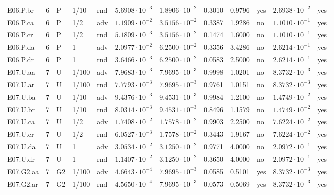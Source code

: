 {\begin{longtable}{@{}lllllllllll l@{}}
E06.P.br & 6 & P & 1/10 & rnd & $5.6908\cdot 10^{-3}$ & $1.8906\cdot 10^{-2}$ & 0.3010 & 0.9796 & yes & $2.6938\cdot 10^{-2}$ & yes \\
E06.P.ca & 6 & P & 1/2 & adv & $1.1909\cdot 10^{-2}$ & $3.5156\cdot 10^{-2}$ & 0.3387 & 1.9286 & no & $1.1010\cdot 10^{-1}$ & yes \\
E06.P.cr & 6 & P & 1/2 & rnd & $5.1809\cdot 10^{-3}$ & $3.5156\cdot 10^{-2}$ & 0.1474 & 1.6000 & no & $1.1010\cdot 10^{-1}$ & yes \\
E06.P.da & 6 & P & 1 & adv & $2.0977\cdot 10^{-2}$ & $6.2500\cdot 10^{-2}$ & 0.3356 & 3.4286 & no & $2.6214\cdot 10^{-1}$ & yes \\
E06.P.dr & 6 & P & 1 & rnd & $3.6466\cdot 10^{-3}$ & $6.2500\cdot 10^{-2}$ & 0.0583 & 2.5000 & no & $2.6214\cdot 10^{-1}$ & yes \\
E07.U.aa & 7 & U & 1/100 & adv & $7.9683\cdot 10^{-3}$ & $7.9695\cdot 10^{-3}$ & 0.9998 & 1.0201 & no & $8.3732\cdot 10^{-3}$ & yes \\
E07.U.ar & 7 & U & 1/100 & rnd & $7.7793\cdot 10^{-3}$ & $7.9695\cdot 10^{-3}$ & 0.9761 & 1.0151 & no & $8.3732\cdot 10^{-3}$ & yes \\
E07.U.ba & 7 & U & 1/10 & adv & $9.4376\cdot 10^{-3}$ & $9.4531\cdot 10^{-3}$ & 0.9984 & 1.2100 & no & $1.4749\cdot 10^{-2}$ & yes \\
E07.U.br & 7 & U & 1/10 & rnd & $8.0314\cdot 10^{-3}$ & $9.4531\cdot 10^{-3}$ & 0.8496 & 1.1579 & no & $1.4749\cdot 10^{-2}$ & yes \\
E07.U.ca & 7 & U & 1/2 & adv & $1.7408\cdot 10^{-2}$ & $1.7578\cdot 10^{-2}$ & 0.9903 & 2.2500 & no & $7.6224\cdot 10^{-2}$ & yes \\
E07.U.cr & 7 & U & 1/2 & rnd & $6.0527\cdot 10^{-3}$ & $1.7578\cdot 10^{-2}$ & 0.3443 & 1.9167 & no & $7.6224\cdot 10^{-2}$ & yes \\
E07.U.da & 7 & U & 1 & adv & $3.0534\cdot 10^{-2}$ & $3.1250\cdot 10^{-2}$ & 0.9771 & 4.0000 & no & $2.0972\cdot 10^{-1}$ & yes \\
E07.U.dr & 7 & U & 1 & rnd & $1.1407\cdot 10^{-2}$ & $3.1250\cdot 10^{-2}$ & 0.3650 & 4.0000 & no & $2.0972\cdot 10^{-1}$ & yes \\
E07.G2.aa & 7 & G2 & 1/100 & adv & $4.6643\cdot 10^{-4}$ & $7.9695\cdot 10^{-3}$ & 0.0585 & 0.5101 & yes & $8.3732\cdot 10^{-3}$ & yes \\
E07.G2.ar & 7 & G2 & 1/100 & rnd & $4.5650\cdot 10^{-4}$ & $7.9695\cdot 10^{-3}$ & 0.0573 & 0.5069 & yes & $8.3732\cdot 10^{-3}$ & yes \\

\end{longtable}}
